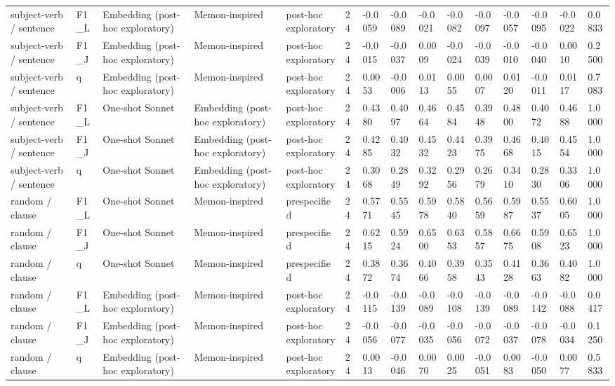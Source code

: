 \begin{table}[t]
{\begin{tabular}{lllllllllllllll}
subject-verb / sentence & F1\_L & Embedding (post-hoc exploratory) & Memon-inspired & post-hoc exploratory & 24 & -0.0059 & -0.0089 & -0.0021 & -0.0082 & -0.0097 & -0.0057 & -0.0095 & -0.0022 & 0.0833 \\
subject-verb / sentence & F1\_J & Embedding (post-hoc exploratory) & Memon-inspired & post-hoc exploratory & 24 & -0.0015 & -0.0037 & 0.0009 & -0.0024 & -0.0039 & -0.0010 & -0.0040 & 0.0010 & 0.2500 \\
subject-verb / sentence & q & Embedding (post-hoc exploratory) & Memon-inspired & post-hoc exploratory & 24 & 0.0053 & -0.0006 & 0.0113 & 0.0055 & 0.0007 & 0.0120 & -0.0011 & 0.0117 & 0.7083 \\
subject-verb / sentence & F1\_L & One-shot Sonnet & Embedding (post-hoc exploratory) & post-hoc exploratory & 24 & 0.4380 & 0.4097 & 0.4664 & 0.4584 & 0.3948 & 0.4800 & 0.4072 & 0.4688 & 1.0000 \\
subject-verb / sentence & F1\_J & One-shot Sonnet & Embedding (post-hoc exploratory) & post-hoc exploratory & 24 & 0.4285 & 0.4032 & 0.4532 & 0.4423 & 0.3975 & 0.4668 & 0.4015 & 0.4554 & 1.0000 \\
subject-verb / sentence & q & One-shot Sonnet & Embedding (post-hoc exploratory) & post-hoc exploratory & 24 & 0.3068 & 0.2849 & 0.3292 & 0.2956 & 0.2679 & 0.3410 & 0.2830 & 0.3306 & 1.0000 \\
random / clause & F1\_L & One-shot Sonnet & Memon-inspired & prespecified & 24 & 0.5771 & 0.5545 & 0.5978 & 0.5840 & 0.5659 & 0.5987 & 0.5537 & 0.6005 & 1.0000 \\
random / clause & F1\_J & One-shot Sonnet & Memon-inspired & prespecified & 24 & 0.6215 & 0.5924 & 0.6500 & 0.6353 & 0.5857 & 0.6675 & 0.5908 & 0.6523 & 1.0000 \\
random / clause & q & One-shot Sonnet & Memon-inspired & prespecified & 24 & 0.3872 & 0.3674 & 0.4066 & 0.3958 & 0.3543 & 0.4128 & 0.3663 & 0.4082 & 1.0000 \\
random / clause & F1\_L & Embedding (post-hoc exploratory) & Memon-inspired & post-hoc exploratory & 24 & -0.0115 & -0.0139 & -0.0089 & -0.0108 & -0.0139 & -0.0089 & -0.0142 & -0.0088 & 0.0417 \\
random / clause & F1\_J & Embedding (post-hoc exploratory) & Memon-inspired & post-hoc exploratory & 24 & -0.0056 & -0.0077 & -0.0035 & -0.0056 & -0.0072 & -0.0037 & -0.0078 & -0.0034 & 0.1250 \\
random / clause & q & Embedding (post-hoc exploratory) & Memon-inspired & post-hoc exploratory & 24 & 0.0013 & -0.0046 & 0.0070 & 0.0025 & -0.0051 & 0.0083 & -0.0050 & 0.0077 & 0.5833 \\

\end{tabular}}
\end{table}
